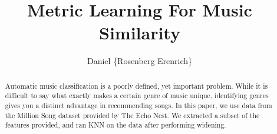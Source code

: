 \documentclass[a4paper,10pt]{article}
\title{Metric Learning For Music Similarity}
\author{Daniel \{Rosenberg Erenrich\} }
\begin{document}
\maketitle

\begin{abstract}
Automatic music classification is a poorly defined, yet important problem. While it is difficult to say what exactly makes a certain genre of music unique, identifying genres gives you a distinct advantage in recommending songs. In this paper, we use data from the Million Song dataset provided by The Echo Nest. We extracted a subset of the features provided, and ran KNN on the data after performing widening.
\end{abstract}

\section{}
\end{document}
